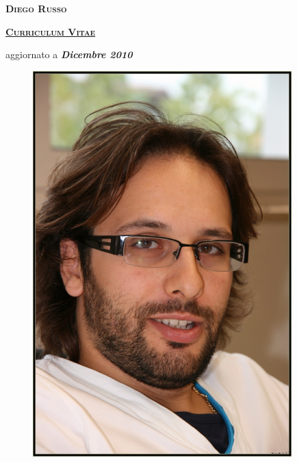 \documentclass[totpages,helvetica,openbib,italian]{europecv}
\begin{document}
    \begin{center}
        \hspace{1pt}
        \vspace{2cm}
    
        {\scshape \textbf{\Huge Diego Russo}}
    
        \vspace{1cm}
    
        {\scshape \textbf{\Large \underline{Curriculum Vitae}}}
    
        \vspace{0.25cm}
    
        {\large aggiornato a \emph{\textbf{Dicembre 2010}}}
        
        \vspace{2cm}
        
        \begin{figure}[htbp] 
            \begin{center} 
                \includegraphics[width=10cm]{io.jpg}
            \end{center} 
        \end{figure}
        
    \end{center}
\pagebreak
{}
\end{document}

